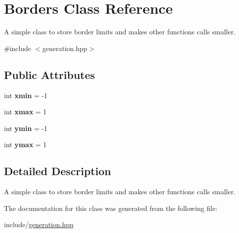 \hypertarget{class_borders}{}\section{Borders Class Reference}
\label{class_borders}


A simple class to store border limits and makes other functions calls smaller.  




{\ttfamily \#include $<$generation.\+hpp$>$}

\subsection*{Public Attributes}
\begin{DoxyCompactItemize}
\item 
\mbox{\label{class_borders_a48e4a54d9c91276d6be3aee362afd108}} 
int {\bfseries xmin} = -\/1
\item 
\mbox{\label{class_borders_ada7ce17f999e756d900b96d0fcfbb702}} 
int {\bfseries xmax} = 1
\item 
\mbox{\label{class_borders_aadea7ff4c53ffe3d345c378537631904}} 
int {\bfseries ymin} = -\/1
\item 
\mbox{\label{class_borders_abe71150b04027700778a6a8d2907536a}} 
int {\bfseries ymax} = 1
\end{DoxyCompactItemize}


\subsection{Detailed Description}
A simple class to store border limits and makes other functions calls smaller. 

The documentation for this class was generated from the following file\+:\begin{DoxyCompactItemize}
\item 
include/\mbox{\hyperlink{generation_8hpp}{generation.\+hpp}}\end{DoxyCompactItemize}
